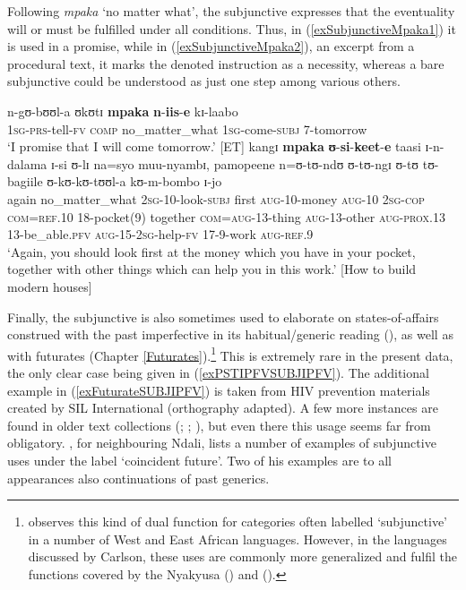 Following \textit{mpaka} \lq no matter what', the subjunctive expresses that the eventuality will or must be fulfilled under all conditions. Thus, in (\ref{exSubjunctiveMpaka1}) it is used in a promise, while in (\ref{exSubjunctiveMpaka2}), an excerpt from a procedural text, it marks the denoted instruction as a necessity, whereas a bare subjunctive could be understood as just one step among various others.
\begin{exe}
\ex\label{exSubjunctiveMpaka1}
\gll n-gʊ-bʊʊl-a ʊkʊtɪ \textbf{mpaka} \textbf{n}-\textbf{iis}-\textbf{e} kɪ-laabo\\
1\textsc{sg}-\textsc{prs}-tell-\textsc{fv} \textsc{comp} no\_matter\_what \textsc{1sg}-come-\textsc{subj} 7-tomorrow\\
\glt `I promise that I will come tomorrow.' [ET]
\ex\label{exSubjunctiveMpaka2} 
\gll kangɪ \textbf{mpaka} \textbf{ʊ}-\textbf{si}-\textbf{keet}-\textbf{e} taasi ɪ-n-dalama ɪ-si ʊ-lɪ na=syo muu-nyambɪ, pamopeene n=ʊ-tʊ-ndʊ ʊ-tʊ-ngɪ ʊ-tʊ tʊ-bagiile ʊ-kʊ-kʊ-tʊʊl-a kʊ-m-bombo ɪ-jo\\
again no\_matter\_what \textsc{2sg}-10-look-\textsc{subj} first \textsc{aug}-10-money \textsc{aug}-10 \textsc{2sg}-\textsc{cop} \textsc{com}=\textsc{ref}.10 18-pocket(9) together \textsc{com}=\textsc{aug}-13-thing \textsc{aug}-13-other \textsc{aug}-\textsc{prox}.13 13-be\_able.\textsc{pfv} \textsc{aug}-15-\textsc{2sg}-help-\textsc{fv} 17-9-work \textsc{aug}-\textsc{ref}.9\\
\glt `Again, you should look first at the money which you have in your pocket, together with other things which can help you in this work.' [How to build modern houses]
\end{exe}

Finally, the subjunctive is also sometimes used to elaborate on states-of-affairs construed with the past imperfective in its habitual/generic reading (), as well as with futurates (Chapter \ref{Futurates}).\footnote{\citet{CarlsonR1992} observes this kind of dual function for categories often labelled \lq subjunctive' in a number of West and East African languages. However, in the languages discussed by Carlson, these uses are commonly more generalized and fulfil the functions covered by the Nyakyusa  () and  ().} This is extremely rare in the present data, the only clear case being given in (\ref{exPSTIPFVSUBJIPFV}). The additional example in (\ref{exFuturateSUBJIPFV}) is taken from HIV prevention materials created by SIL International (orthography adapted). A few more instances are found in older text collections (\citealt{BergerP1933}; \citealt{BusseJ1942}; \citeyear{BusseJ1949}), but even there this usage seems far from obligatory.  \citet[130]{BotneR2008}, for neighbouring Ndali, lists a number of examples of subjunctive uses under the label \lq coincident future'. Two of his examples are to all appearances also continuations of past generics.

